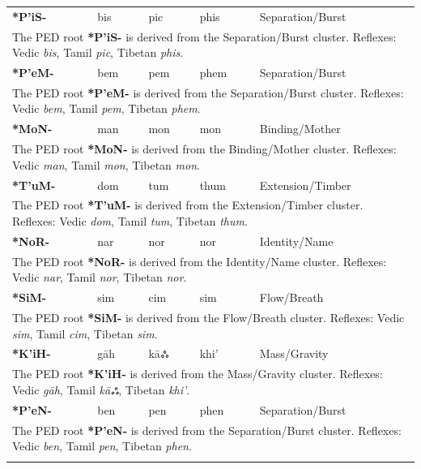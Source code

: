 \begin{longtable}{p{} p{} p{} p{} p{}}
\textbf{*P'iS-} & bis & pic & phis & Separation/Burst \\ 
\multicolumn{5}{p{\textwidth}}{\small The PED root \textbf{*P'iS-} is derived from the Separation/Burst cluster. Reflexes: Vedic \textit{bis}, Tamil \textit{pic}, Tibetan \textit{phis}. } \\ \addlinespace 
\textbf{*P'eM-} & bem & pem & phem & Separation/Burst \\ 
\multicolumn{5}{p{\textwidth}}{\small The PED root \textbf{*P'eM-} is derived from the Separation/Burst cluster. Reflexes: Vedic \textit{bem}, Tamil \textit{pem}, Tibetan \textit{phem}. } \\ \addlinespace 
\textbf{*MoN-} & man & mon & mon & Binding/Mother \\ 
\multicolumn{5}{p{\textwidth}}{\small The PED root \textbf{*MoN-} is derived from the Binding/Mother cluster. Reflexes: Vedic \textit{man}, Tamil \textit{mon}, Tibetan \textit{mon}. } \\ \addlinespace 
\textbf{*T'uM-} & dom & tum & thum & Extension/Timber \\ 
\multicolumn{5}{p{\textwidth}}{\small The PED root \textbf{*T'uM-} is derived from the Extension/Timber cluster. Reflexes: Vedic \textit{dom}, Tamil \textit{tum}, Tibetan \textit{thum}. } \\ \addlinespace 
\textbf{*NoR-} & nar & nor & nor & Identity/Name \\ 
\multicolumn{5}{p{\textwidth}}{\small The PED root \textbf{*NoR-} is derived from the Identity/Name cluster. Reflexes: Vedic \textit{nar}, Tamil \textit{nor}, Tibetan \textit{nor}. } \\ \addlinespace 
\textbf{*SiM-} & sim & cim & sim & Flow/Breath \\ 
\multicolumn{5}{p{\textwidth}}{\small The PED root \textbf{*SiM-} is derived from the Flow/Breath cluster. Reflexes: Vedic \textit{sim}, Tamil \textit{cim}, Tibetan \textit{sim}. } \\ \addlinespace 
\textbf{*K'iH-} & gāh & kāஃ & khi' & Mass/Gravity \\ 
\multicolumn{5}{p{\textwidth}}{\small The PED root \textbf{*K'iH-} is derived from the Mass/Gravity cluster. Reflexes: Vedic \textit{gāh}, Tamil \textit{kāஃ}, Tibetan \textit{khi'}. } \\ \addlinespace 
\textbf{*P'eN-} & ben & pen & phen & Separation/Burst \\ 
\multicolumn{5}{p{\textwidth}}{\small The PED root \textbf{*P'eN-} is derived from the Separation/Burst cluster. Reflexes: Vedic \textit{ben}, Tamil \textit{pen}, Tibetan \textit{phen}. } \\ \addlinespace 

\end{longtable}
